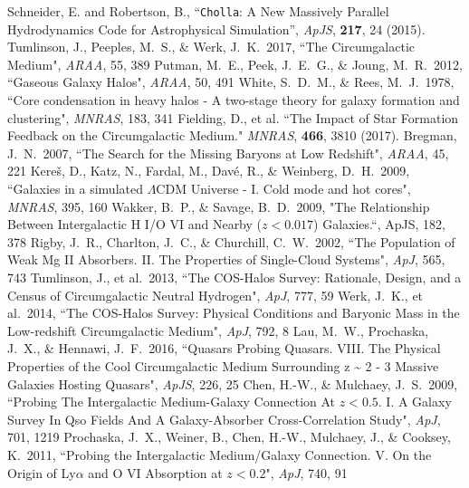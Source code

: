 \documentclass[11pt,letterpaper,english]{article}
\begin{document}
{\footnotesize

\renewcommand{\section}[2]{}
\begin{thebibliography}{500}
 Schneider, E. and Robertson, B., ``{\tt Cholla}: A New Massively Parallel Hydrodynamics Code for Astrophysical Simulation'', {\em ApJS}, {\bf 217}, 24 (2015).
 Tumlinson, J., Peeples, M.~S., \& Werk, J.~K.\ 2017,  ``The Circumgalactic Medium", {\em ARAA}, 55, 389 
 Putman, M.~E., Peek, J.~E.~G., \& Joung, M.~R.\ 2012,  ``Gaseous Galaxy Halos", {\em ARAA}, 50, 491 
 White, S.~D.~M., \& Rees, M.~J.\ 1978,  ``Core condensation in heavy halos - A two-stage theory for galaxy formation and clustering", {\em MNRAS}, 183, 341 
 Fielding, D., et al. ``The Impact of Star Formation Feedback on the Circumgalactic Medium." {\em MNRAS}, {\bf 466}, 3810 (2017).
 Bregman, J.~N.\ 2007,  ``The Search for the Missing Baryons at Low Redshift", {\em ARAA}, 45, 221
 Kere{\v s}, D., Katz, N., Fardal, M., Dav{\'e}, R., \& Weinberg, D.~H.\ 2009,  ``Galaxies in a simulated {$\Lambda$}CDM Universe - I. Cold mode and hot cores", {\em MNRAS}, 395, 160
  Wakker, B.~P.,  \& Savage, B.~D.\ 2009,  "The Relationship Between Intergalactic H I/O VI and Nearby ($z < 0.017$) Galaxies.``, {\rm ApJS}, 182, 378
 Rigby, J.~R., Charlton, J.~C., \& Churchill, C.~W.\ 2002,  ``The Population of Weak Mg II Absorbers. II. The Properties of Single-Cloud Systems", {\em ApJ}, 565, 743 
 Tumlinson, J., et al.\ 2013,  ``The COS-Halos Survey: Rationale, Design, and a Census of Circumgalactic Neutral Hydrogen", {\em ApJ}, 777, 59 
 Werk, J.~K., et al.\ 2014,  ``The COS-Halos Survey: Physical Conditions and Baryonic Mass in the Low-redshift Circumgalactic Medium", {\em ApJ}, 792, 8 
 Lau, M.~W., Prochaska, J.~X., \& Hennawi, J.~F.\ 2016,  ``Quasars Probing Quasars. VIII. The Physical Properties of the Cool Circumgalactic Medium Surrounding z \~{} 2 - 3 Massive Galaxies Hosting Quasars", {\em ApJS}, 226, 25 
 Chen, H.-W., \& Mulchaey, J.~S.\ 2009,  ``Probing The Intergalactic Medium-Galaxy Connection At $z < 0.5$. I. A Galaxy Survey In Qso Fields And A Galaxy-Absorber Cross-Correlation Study", {\em ApJ}, 701, 1219 
 Prochaska, J.~X., Weiner, B., Chen, H.-W., Mulchaey, J., \& Cooksey, K.\ 2011,  ``Probing the Intergalactic Medium/Galaxy Connection. V. On the Origin of Ly{$\alpha$} and O VI Absorption at $z < 0.2$", {\em ApJ}, 740, 91 

\end{thebibliography}}
\end{document}
